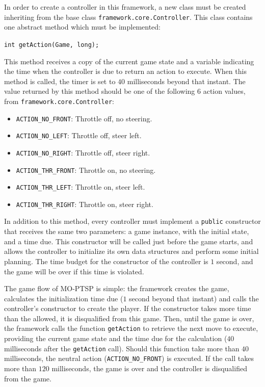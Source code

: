 \documentclass[conference]{IEEEtran}
\newcommand{\code}[1]{{\lstinline!#1!}}
\begin{document}
In order to create a controller in this framework, a new class must be created inheriting from the base class \code{framework.core.Controller}. This class contains one abstract method which must be implemented: 

\begin{center}
\code{int getAction(Game, long);}
\end{center}

This method receives a copy of the current game state and a variable indicating the time when the controller is due to return an action to execute. When this method is called, the timer is set to $40$ milliseconds beyond that instant. The value returned by this method should be one of the following $6$ action values, from \code{framework.core.Controller}:

\begin{itemize}
\item \code{ACTION_NO_FRONT}: Throttle off, no steering.
\item \code{ACTION_NO_LEFT}: Throttle off, steer left.
\item \code{ACTION_NO_RIGHT}: Throttle off, steer right.
\item \code{ACTION_THR_FRONT}: Throttle on, no steering. 
\item \code{ACTION_THR_LEFT}: Throttle on, steer left. 
\item \code{ACTION_THR_RIGHT}: Throttle on, steer right.
\end{itemize}

In addition to this method, every controller must implement a \code{public} constructor that receives the same two parameters: a game instance, with the initial state, and a time due. This constructor will be called just before the game starts, and allows the controller to initialize its own data structures and perform some initial planning. The time budget for the constructor of the controller is $1$ second, and the game will be over if this time is violated.

The game flow of MO-PTSP is simple: the framework creates the game, calculates the initialization time due ($1$ second beyond that instant) and calls the controller's constructor to create the player. If the constructor takes more time than the allowed, it is disqualified from this game. Then, until the game is over, the framework calls the function \code{getAction} to retrieve the next move to execute, providing the current game state and the time due for the calculation ($40$ milliseconds after the \code{getAction} call). Should this function take more than $40$ milliseconds, the neutral action (\code{ACTION_NO_FRONT}) is executed. If the call takes more than $120$ milliseconds, the game is over and the controller is disqualified from the game.
\end{document}
